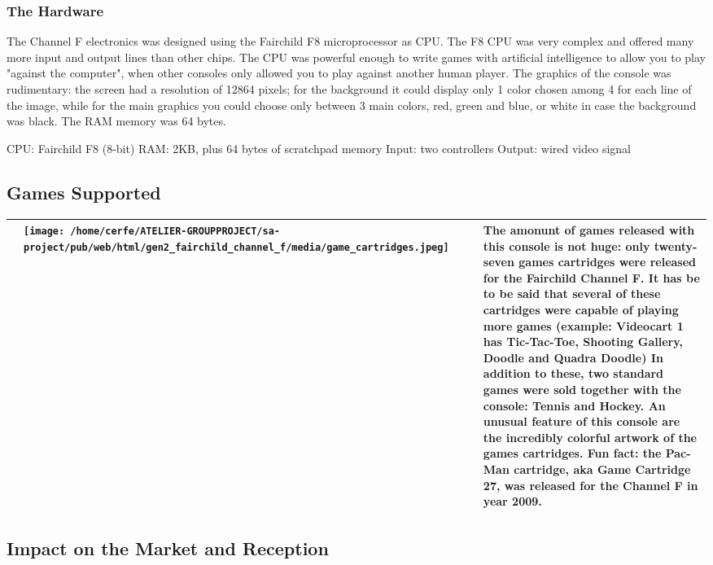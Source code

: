 \documentclass[a4paper,10pt]{book}
\begin{document}
 \subsubsection{The Hardware }
 
          The Channel F electronics was designed using the Fairchild F8 microprocessor as CPU.
          The F8 CPU was very complex and offered many more input and output lines than other chips.
          The CPU was powerful enough to write games with artificial intelligence to allow you to play
          "against the computer", when other consoles only allowed you to play against another human player.
          The graphics of the console was rudimentary: the screen had a resolution of 12864 pixels;
          for the background it could display only 1 color chosen among 4 for each line of the image, while for the
          main graphics you could choose only between 3 main colors, red, green and blue, or white in case the background was black.
          The RAM memory was 64 bytes.
           
 CPU: Fairchild F8 (8-bit) 
 RAM: 2KB, plus 64 bytes of scratchpad memory 
 Input: two controllers 
 Output: wired video signal 
 
 
 \subsection{Games Supported }
 \begin{longtable}{p{1mm}|l|l|l|}\hline
 
 & \texttt{[image: /home/cerfe/ATELIER-GROUPPROJECT/sa-project/pub/web/html/gen2\_fairchild\_channel\_f/media/game\_cartridges.jpeg]}
 
 & 
 & The amonunt of games released with this console is not huge: only twenty-seven games cartridges were released
          for the Fairchild Channel F. It has be to be said that several of these cartridges were capable of playing
          more games (example: Videocart 1 has Tic-Tac-Toe, Shooting Gallery, Doodle and Quadra Doodle)
          In addition to these, two standard games were sold together with the console: Tennis and Hockey. An unusual
          feature of this console are the incredibly colorful artwork of the games cartridges. Fun fact: the Pac-Man cartridge,
              aka Game Cartridge 27, was released for the Channel F in year 2009.
           
 \\\hline
 \end{longtable}
 \subsection{Impact on the Market and Reception }
 
\end{document}
